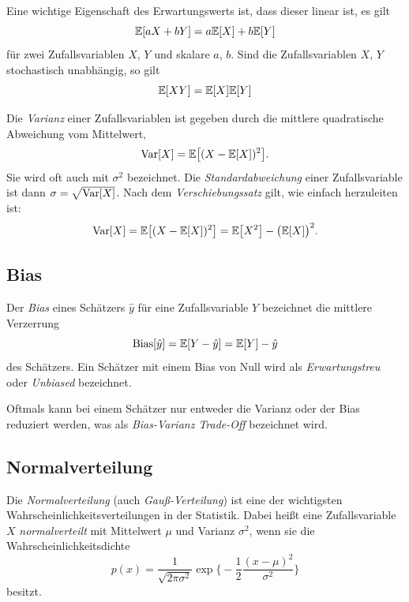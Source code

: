 			Eine wichtige Eigenschaft des Erwartungswerts ist, dass dieser linear ist, \dh es gilt
			\begin{equation}
				\mathbb{E}[aX + bY] = a \mathbb{E}[X] + b \mathbb{E}[Y]
			\end{equation}
			für zwei Zufallsvariablen \(X\), \(Y\) und skalare \(a\), \(b\). Sind die Zufallsvariablen \(X\), \(Y\) stochastisch unabhängig, so gilt
			\begin{equation}
				\mathbb{E}[XY] = \mathbb{E}[X] \mathbb{E}[Y]
			\end{equation}

			Die \emph{Varianz} einer Zufallsvariablen ist gegeben durch die mittlere quadratische Abweichung vom Mittelwert,
			\begin{equation}
				\operatorname{Var}[X] = \mathbb{E}\big[ (X - \mathbb{E}[X])^2 \big].
			\end{equation}
			Sie wird oft auch mit \(\sigma^2\) bezeichnet. Die \emph{Standardabweichung} einer Zufallsvariable ist dann \(\sigma = \sqrt{\operatorname{Var}[X]}\). Nach dem \emph{Verschiebungssatz} gilt, wie einfach herzuleiten ist:
			\begin{equation}
				\operatorname{Var}[X] = \mathbb{E}\big[ (X - \mathbb{E}[X])^2 \big] = \mathbb{E}\big[ X^2 \big] - \big( \mathbb{E}[X] \big)^2.
			\end{equation}

		\subsection{Bias}
			\label{subsec:foundationsBias}

			Der \emph{Bias} eines Schätzers \(\hat{y}\) für eine Zufallsvariable \(Y\) bezeichnet die mittlere Verzerrung
			\begin{equation}
				\operatorname{Bias}[\hat{y}] = \mathbb{E}[Y - \hat{y}] = \mathbb{E}[Y] - \hat{y}
			\end{equation}
			des Schätzers. Ein Schätzer mit einem Bias von Null wird als \emph{Erwartungstreu} oder \emph{Unbiased} bezeichnet.

			Oftmals kann bei einem Schätzer nur entweder die Varianz oder der Bias reduziert werden, was als \emph{Bias-Varianz Trade-Off} bezeichnet wird.

		\subsection{Normalverteilung}
			Die \emph{Normalverteilung} (auch \emph{Gauß-Verteilung}) ist eine der wichtigsten Wahrscheinlichkeitsverteilungen in der Statistik. Dabei heißt eine Zufallsvariable \(X\) \emph{normalverteilt} mit Mittelwert \(\mu\) und Varianz \(\sigma^2\), wenn sie die Wahrscheinlichkeitsdichte
			\begin{equation}
				p(x) = \frac{1}{\sqrt{2 \pi \sigma^2}} \exp\bigg\{\!\! -\frac{1}{2} \frac{(x - \mu)^2}{\sigma^2} \bigg\}
			\end{equation}
			besitzt.

